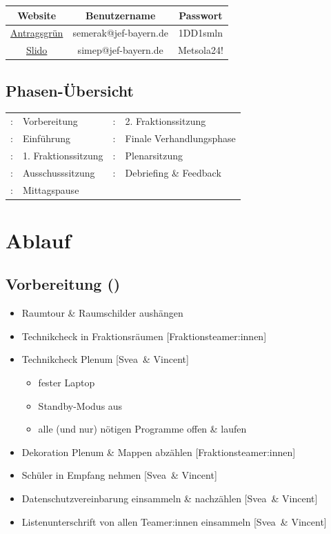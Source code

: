 \documentclass{article}
\newcommand{\KOM}{Svea}
\newcommand{\EP}{Vincent}
\begin{document}
	\begin{center}
	\begin{tabular}{c|c|c}
		Website & Benutzername & Passwort \\
        \hline
        \href{https://simep-bayern.antragsgruen.de/}{Antragsgrün} & semerak@jef-bayern.de	& 1DD1smln \\
		\href{https://slido.com/}{Slido} & simep@jef-bayern.de	& Metsola24! \\
	\end{tabular}
	\end{center}	
	
	\subsection{Phasen-Übersicht}
	
	\begin{tabular}{cl|cl}
		\timeVorb: 	 	& Vorbereitung 			& \timeFrakTwo:	& 2. Fraktionssitzung \\
		\timeEinf: 	 	& Einführung 			& \timeFinVerh:	& Finale Verhandlungsphase \\
		\timeFrakOne:	& 1. Fraktionssitzung 	& \timePlenar:	& Plenarsitzung \\
		\timeAuss: 		& Ausschusssitzung 		& \timeDebr:	& Debriefing \& Feedback \\
		\timeMittag: 	& Mittagspause 			& 
	\end{tabular}		
	
	\newpage	
	
	
	\section{Ablauf}
	\subsection{Vorbereitung (\timeVorb)}
	\begin{itemize}
		\item Raumtour \& Raumschilder aushängen
        \item Technikcheck in Fraktionsräumen [Fraktionsteamer:innen]
		\item Technikcheck Plenum [\KOM\ \& \EP]
		\begin{itemize}
			\item fester Laptop
			\item Standby-Modus aus
			\item alle (und nur) nötigen Programme offen \& laufen
		\end{itemize}
		\item Dekoration Plenum \& Mappen abzählen [Fraktionsteamer:innen]
		\item Schüler in Empfang nehmen [\KOM\ \& \EP]
		\item Datenschutzvereinbarung einsammeln \& nachzählen [\KOM\ \& \EP]
		\item Listenunterschrift von allen Teamer:innen einsammeln [\KOM\ \& \EP]
	\end{itemize}
	
\end{document}
